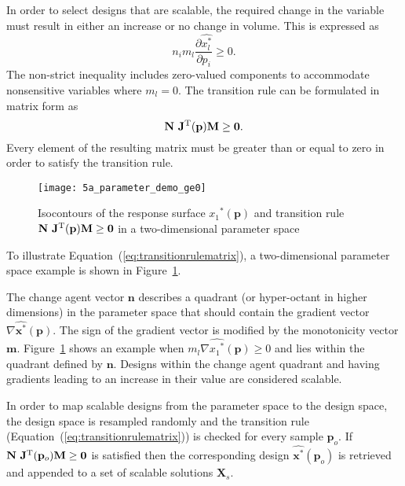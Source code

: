 In order to select designs that are scalable, the required change in the variable must result in either an increase or no change in volume. This is expressed as
%
\begin{equation}
	\label{eq:transitionrule}
	n_i m_l\dfrac{\partial \hat{x_l^*}}{\partial p_i} \ge 0.
\end{equation}
%
The non-strict inequality includes zero-valued components to accommodate nonsensitive variables where $m_l = 0$. The transition rule can be formulated in matrix form as 
\begin{equation}
		\mathbf{N}~\mathbf{J}^{\text T}(\mathbf{p})\mathbf{M} \ge \mathbf{0}.
		 \label{eq:transitionrulematrix}
\end{equation}
Every element of the resulting matrix must be greater than or equal to zero in order to satisfy the transition rule.

\begin{figure}[h!]
	\centering
	\texttt{[image: 5a\_parameter\_demo\_ge0]}
	\caption{Isocontours of the response surface ${x_1}^*(\mathbf{p})$ and transition rule $\mathbf{N}~\mathbf{J}^{\text T}(\mathbf{p})\mathbf{M} \ge \mathbf{0}$ in a two-dimensional parameter space}
	\label{fig:contourdemo}
\end{figure}

To illustrate Equation~(\ref{eq:transitionrulematrix}), a two-dimensional parameter space example is shown in Figure~\ref{fig:contourdemo}. 

The change agent vector $\mathbf{n}$ describes a quadrant (or hyper-octant in higher dimensions) in the parameter space that should contain the gradient vector $\nabla\hat{\mathbf{x}^*}(\mathbf{p})$. The sign of the gradient vector is modified by the monotonicity vector $\mathbf{m}$. Figure~\ref{fig:contourdemo} shows an example when $m_l\nabla\hat{{x_1}^*}(\mathbf{p}) \ge 0$ and lies within the quadrant defined by $\mathbf{n}$. Designs within the change agent quadrant and having gradients leading to an increase in their value are considered scalable.

In order to map scalable designs from the parameter space to the design space, the design space is resampled randomly and the transition rule (Equation~(\ref{eq:transitionrulematrix})) is checked for every sample $\mathbf{p}_o$. If $\mathbf{N}~\mathbf{J}^{\text T}(\mathbf{p}_o)\mathbf{M} \ge \mathbf{0}$ is satisfied then the corresponding design $\hat{\mathbf{x}^*}(\mathbf{p}_o)$ is retrieved and appended to a set of scalable solutions $\mathbf{X}_s$.

